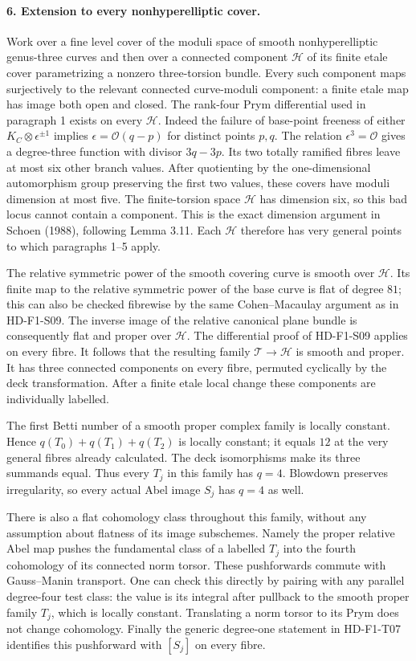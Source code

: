 \paragraph{6. Extension to every nonhyperelliptic cover.}
Work over a fine level cover of the moduli space of smooth
nonhyperelliptic genus-three curves and then over a connected
component $\mathcal H$ of its finite etale cover parametrizing
a nonzero three-torsion bundle. Every such component maps
surjectively to the relevant connected curve-moduli component:
a finite etale map has image both open and closed.
The rank-four Prym differential used in paragraph 1 exists
on every $\mathcal H$. Indeed the failure of base-point
freeness of either $K_C\otimes\epsilon^{\pm1}$ implies
$\epsilon=\mathcal O(q-p)$ for distinct points $p,q$.
The relation $\epsilon^3=\mathcal O$ gives a degree-three
function with divisor $3q-3p$. Its two totally ramified
fibres leave at most six other branch values. After
quotienting by the one-dimensional automorphism group
preserving the first two values, these covers have
moduli dimension at most five. The finite-torsion
space $\mathcal H$ has dimension six, so this bad locus
cannot contain a component. This is the exact dimension
argument in Schoen (1988), following Lemma 3.11.
Each $\mathcal H$ therefore has very general points to
which paragraphs 1--5 apply.

The relative symmetric power of the smooth covering
curve is smooth over $\mathcal H$. Its finite map to
the relative symmetric power of the base curve is flat
of degree $81$; this can also be checked fibrewise by
the same Cohen--Macaulay argument as in HD-F1-S09.
The inverse image of the relative canonical plane
bundle is consequently flat and proper over
$\mathcal H$. The differential proof of HD-F1-S09
applies on every fibre. It follows that the resulting
family $\mathcal T\to\mathcal H$ is smooth and proper.
It has three connected components on every fibre,
permuted cyclically by the deck transformation.
After a finite etale local change these components
are individually labelled.

The first Betti number of a smooth proper complex
family is locally constant. Hence
$q(T_0)+q(T_1)+q(T_2)$ is locally constant; it equals
$12$ at the very general fibres already calculated.
The deck isomorphisms make its three summands equal.
Thus every $T_j$ in this family has $q=4$. Blowdown
preserves irregularity, so every actual Abel image
$S_j$ has $q=4$ as well.

There is also a flat cohomology class throughout this
family, without any assumption about flatness of its
image subschemes. Namely the proper relative Abel
map pushes the fundamental class of a labelled
$T_j$ into the fourth cohomology of its connected
norm torsor. These pushforwards commute with
Gauss--Manin transport. One can check this directly
by pairing with any parallel degree-four test class:
the value is its integral after pullback to the
smooth proper family $T_j$, which is locally
constant. Translating a norm torsor to its Prym
does not change cohomology. Finally the generic
degree-one statement in HD-F1-T07 identifies this
pushforward with $[S_j]$ on every fibre.

